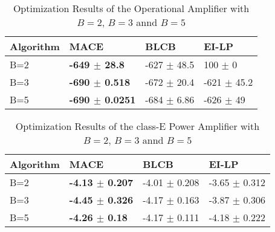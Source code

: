 \begin{table*}[!htb]
    \centering
    \caption{Optimization Results of the Operational Amplifier with $B = 2$, $B = 3$ annd $B = 5$}
    \label{tab:result_opamp_vary_B}
    \begin{tabular}{llll}
        \toprule
        Algorithm & MACE                          & BLCB                  & EI-LP             \\ \midrule
        B=2       & \textbf{-649  $\pm$  28.8}    &  -627  $\pm$  48.5  &  100   $\pm$  0     \\
        B=3       & \textbf{-690  $\pm$  0.518}   &  -672  $\pm$  20.4  &  -621  $\pm$  45.2  \\
        B=5       & \textbf{-690  $\pm$  0.0251}  &  -684  $\pm$  6.86  &  -626  $\pm$  49    \\
        \bottomrule
    \end{tabular}
\end{table*}


\begin{table*}[!htb]
    \centering
    \caption{Optimization Results of the class-E Power Amplifier with $B = 2$, $B = 3$ annd $B = 5$}
    \label{tab:result_classE_vary_B}
    \begin{tabular}{llll}
        \toprule
        Algorithm     & MACE                       & BLCB                        & EI-LP          \\
        \midrule
        B=2       & \textbf{-4.13  $\pm$  0.207}  &  -4.01  $\pm$  0.208  &  -3.65  $\pm$  0.312  \\
        B=3       & \textbf{-4.45  $\pm$  0.326}  &  -4.17  $\pm$  0.163  &  -3.87  $\pm$  0.306  \\
        B=5       & \textbf{-4.26  $\pm$  0.18 }  &  -4.17  $\pm$  0.111  &  -4.18  $\pm$  0.222  \\
        \bottomrule
    \end{tabular}
\end{table*}
